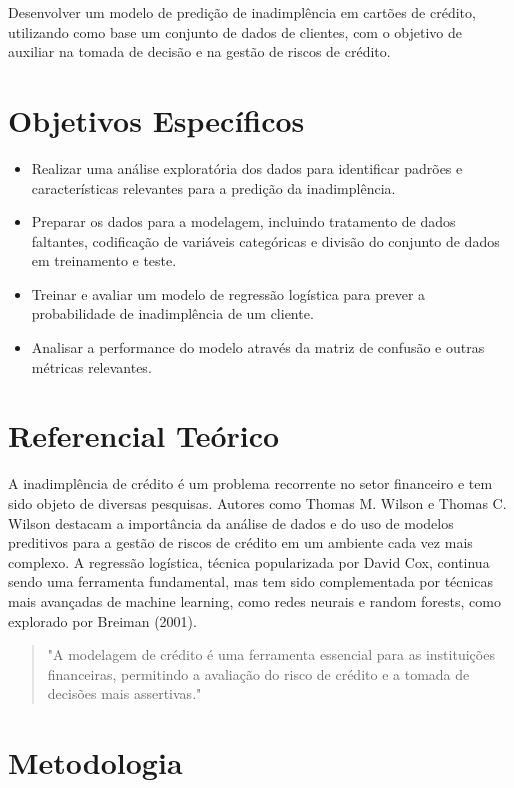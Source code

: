 \documentclass{abntpuc}
\begin{document}
Desenvolver um modelo de predição de inadimplência em cartões de crédito, utilizando como base um conjunto de dados de clientes, com o objetivo de auxiliar na tomada de decisão e na gestão de riscos de crédito.

\section{Objetivos Específicos}

\begin{itemize}
    \item Realizar uma análise exploratória dos dados para identificar padrões e características relevantes para a predição da inadimplência.
    \item Preparar os dados para a modelagem, incluindo tratamento de dados faltantes, codificação de variáveis categóricas e divisão do conjunto de dados em treinamento e teste.
    \item Treinar e avaliar um modelo de regressão logística para prever a probabilidade de inadimplência de um cliente.
    \item Analisar a performance do modelo através da matriz de confusão e outras métricas relevantes.
\end{itemize}

\section{Referencial Teórico}

A inadimplência de crédito é um problema recorrente no setor financeiro e tem sido objeto de diversas pesquisas. Autores como Thomas M. Wilson e Thomas C. Wilson destacam a importância da análise de dados e do uso de modelos preditivos para a gestão de riscos de crédito em um ambiente cada vez mais complexo.
A regressão logística, técnica popularizada por David Cox, continua sendo uma ferramenta fundamental, mas tem sido complementada por técnicas mais avançadas de machine learning, como redes neurais e random forests, como explorado por Breiman (2001).

\begin{quote}
    "A modelagem de crédito é uma ferramenta essencial para as instituições financeiras, permitindo a avaliação do risco de crédito e a tomada de decisões mais assertivas."
\end{quote}

\section{Metodologia}
\end{document}
